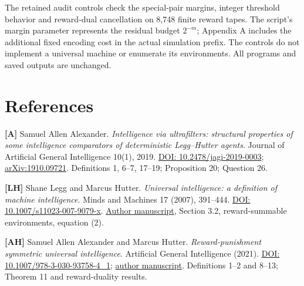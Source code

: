 \documentclass[
  11pt,
  letterpaper,
]{article}
\begin{document}
The retained audit controls check the special-pair margins, integer
threshold behavior and reward-dual cancellation on 8,748 finite reward
tapes. The script's margin parameter represents the residual budget
\(2^{-m}\); Appendix A includes the additional fixed encoding cost in
the actual simulation prefix. The controls do not implement a universal
machine or enumerate its environments. All programs and saved outputs
are unchanged.

\section{References}\label{references}

\textbf{{[}A{]}} Samuel Allen Alexander. \emph{Intelligence via
ultrafilters: structural properties of some intelligence comparators of
deterministic Legg--Hutter agents}. Journal of Artificial General
Intelligence 10(1), 2019.
\href{https://doi.org/10.2478/jagi-2019-0003}{DOI:
10.2478/jagi-2019-0003};
\href{https://arxiv.org/abs/1910.09721}{arXiv:1910.09721}. Definitions
1, 6--7, 17--19; Proposition 20; Question 26.

\textbf{{[}LH{]}} Shane Legg and Marcus Hutter. \emph{Universal
intelligence: a definition of machine intelligence}. Minds and Machines
17 (2007), 391--444.
\href{https://doi.org/10.1007/s11023-007-9079-x}{DOI:
10.1007/s11023-007-9079-x}.
\href{https://www.hutter1.net/ai/iorx.pdf}{Author manuscript}, Section
3.2, reward-summable environments, equation (2).

\textbf{{[}AH{]}} Samuel Allen Alexander and Marcus Hutter.
\emph{Reward-punishment symmetric universal intelligence}. Artificial
General Intelligence (2021).
\href{https://doi.org/10.1007/978-3-030-93758-4_1}{DOI:
10.1007/978-3-030-93758-4\_1};
\href{https://www.hutter1.net/publ/symintel.pdf}{author manuscript}.
Definitions 1--2 and 8--13; Theorem 11 and reward-duality results.
\end{document}
